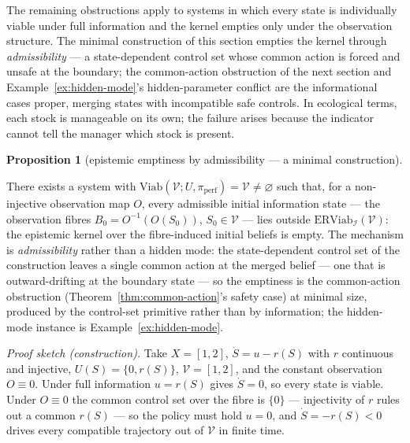 \documentclass[10pt,twocolumn]{article}
\theoremstyle{definition}
\newtheorem{proposition}{Proposition}
\begin{document}
The remaining obstructions apply to systems in which every state is
individually viable under full information and the kernel empties only under the observation structure.
The minimal construction of this section empties the kernel through
\emph{admissibility} --- a state-dependent control set whose common
action is forced and unsafe at the boundary; the common-action
obstruction of the next section and Example~\ref{ex:hidden-mode}'s hidden-parameter
conflict are the informational cases proper, merging states with
incompatible safe controls. In ecological terms, each stock is manageable on its own; the failure arises because the indicator cannot tell the manager which stock is present.

\begin{proposition}[epistemic emptiness by admissibility --- a minimal construction]\label{prop:emptiness}

There exists a system with
\(\mathrm{Viab}(\mathcal{V}; U, \pi_{\mathrm{perf}}) = \mathcal{V} \neq \varnothing\)
such that, for a non-injective observation map \(O\), every admissible
initial information state --- the observation fibres
\(B_0 = O^{-1}(O(S_0))\), \(S_0 \in \mathcal{V}\) --- lies outside
\(\mathrm{ERViab}_{\mathcal{I}}(\mathcal{V})\): the epistemic kernel
over the fibre-induced initial beliefs is empty. The mechanism is \emph{admissibility} rather than a hidden mode: the
state-dependent control set of the construction leaves a single common
action at the merged belief --- one that is outward-drifting at the
boundary state --- so the emptiness is the common-action obstruction
(Theorem~\ref{thm:common-action}'s safety case) at minimal size, produced by the control-set primitive rather than by information; the
hidden-mode instance is Example~\ref{ex:hidden-mode}.

\end{proposition}

\emph{Proof sketch (construction).} Take \(X = [1,2]\), \(\dot S = u - r(S)\) with \(r\) continuous and injective, \(U(S) = \{0, r(S)\}\), \(\mathcal{V} = [1,2]\), and the constant observation \(O \equiv 0\). Under full information \(u = r(S)\) gives \(\dot S = 0\), so every state is viable. Under \(O \equiv 0\) the common control set over the fibre is \(\{0\}\) --- injectivity of \(r\) rules out a common \(r(S)\) --- so the policy must hold \(u = 0\), and \(\dot S = -r(S) < 0\) drives every compatible trajectory out of \(\mathcal{V}\) in finite time.
\end{document}
